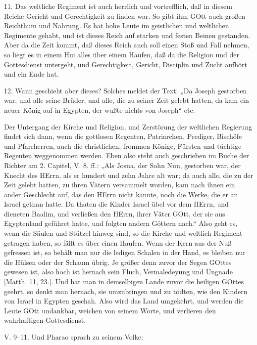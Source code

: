 11. Das weltliche Regiment ist auch herrlich und vortrefflich, daß in diesem Reiche Gericht und Gerechtigkeit zu finden war. So gibt ihm GOtt auch großen Reichthum und Nahrung. Es hat hohe Leute im geistlichen und weltlichen Regimente gehabt, und ist dieses Reich auf starken und festen Beinen gestanden. Aber da die Zeit kommt, daß dieses Reich auch soll einen Stoß und Fall nehmen, so liegt es in einem Hui alles über einem Haufen, daß da die Religion und der Gottesdienst untergeht, und Gerechtigkeit, Gericht, Disciplin und Zucht aufhört und ein Ende hat.

12. Wann geschieht aber dieses? Solches meldet der Text: „Da Joseph gestorben war, und alle seine Brüder, und alle, die zu seiner Zeit gelebt hatten, da kam ein neuer König auf in Egypten, der wußte nichts von Joseph“ etc.

Der Untergang der Kirche und Religion, und Zerstörung der weltlichen Regierung findet sich dann, wenn die gottlosen Regenten, Patriarchen, Prediger, Bischöfe und Pfarrherren, auch die christlichen, frommen Könige, Fürsten und tüchtige Regenten weggenommen werden. Eben also steht auch geschrieben im Buche der Richter am 2. Capitel, V. 8. ff.: „Als Josua, der Sohn Nun, gestorben war, der Knecht des HErrn, als er hundert und zehn Jahre alt war; da auch alle, die zu der Zeit gelebt hatten, zu ihren Vätern versammelt worden, kam nach ihnen ein ander Geschlecht auf, das den HErrn nicht kannte, noch die Werke, die er an Israel gethan hatte. Da thaten die Kinder Israel übel vor dem HErrn, und dieneten Baalim, und verließen den HErrn, ihrer Väter GOtt, der sie aus Egyptenland geführet hatte, und folgten andern Göttern nach.“ Also geht es, wenn die Säulen und Stützel hinweg sind, so die Kirche und weltlich Regiment getragen haben, so fällt es über einen Haufen. Wenn der Kern aus der Nuß gefressen ist, so behält man nur die ledigen Schalen in der Hand, es bleiben nur die Hülsen oder der Schaum übrig. Je größer denn zuvor der Segen GOttes gewesen ist, also hoch ist hernach sein Fluch, Vermaledeyung und Ungnade [Matth. 11, 23.]. Und hat man in demselbigen Lande zuvor die heiligen GOttes geehrt, so denkt man hernach, sie umzubringen und zu tödten, wie den Kindern von Israel in Egypten geschah. Also wird das Land umgekehrt, und werden die Leute GOtt undankbar, weichen von seinem Worte, und verlieren den wahrhaftigen Gottesdienst.

\begin{schriftzitat}
V. 9–11. Und Pharao sprach zu seinem Volke:
\end{schriftzitat}

